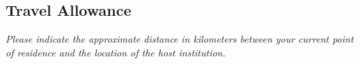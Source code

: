 \subsection{Travel Allowance}

\emph{Please indicate the approximate distance in kilometers between your
  current point of residence and the location of the host institution.}


% 
